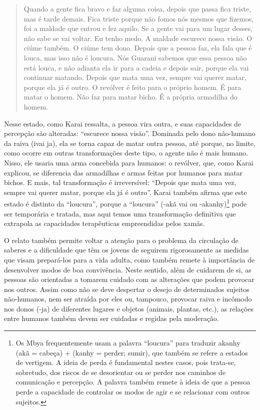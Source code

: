 \begin{quotation}
Quando a gente fica bravo e faz alguma coisa, depois que passa fica
triste, mas é tarde demais. Fica triste porque não fomos nós mesmos que
fizemos, foi a maldade que entrou e fez aquilo. Se a gente vai para um
lugar desses, não sabe se vai voltar. Eu tenho medo. A maldade escurece
nossa visão. O ciúme também. O ciúme tem dono. Depois que a pessoa faz,
ela fala que é louca, mas isso não é loucura. Nós Guarani sabemos que
essa pessoa não está louca, e não adianta ela ir para a cadeia e depois
sair, porque ela vai continuar matando. Depois que mata uma vez, sempre
vai querer matar, porque ela já é outro. O revólver é feito para o
próprio homem. É para matar o homem. Não faz para matar bicho. É a
própria armadilha do homem.

\end{quotation}
Nesse estado, como Karai ressalta, a pessoa vira outra, e suas
capacidades de percepção são alteradas: ``escurece nossa visão''.
Dominada pelo dono não-humano da raiva (ivai ja), ela se torna capaz de
matar outra pessoa, até porque, no limite, como ocorre em outras
transformações deste tipo, o agente não é mais humano. Nisso, ele
usaria uma arma concebida para humanos: o revólver, que, como Karai
explicou, se diferencia das armadilhas e armas feitas por humanos para
matar bichos. E mais, tal transformação é irreversível: ``Depois que
mata uma vez, sempre vai querer matar, porque ela já é outro''. Karai
também afirma que este estado é distinto da ``loucura'', porque a
``loucura'' (-akã vai ou {}-akanhy)\footnote{Os Mbya frequentemente usam
a palavra ``loucura'' para traduzir akanhy (akã = cabeça) + (kanhy =
perder; sumir), que também se refere a estados de vertigem. A ideia de
perda é fundamental nestes casos, pois trata-se, sobretudo, dos riscos
de se desorientar ou se perder nos caminhos de comunicação e percepção.
A palavra também remete à ideia de que a pessoa perde a capacidade de
controlar os modos de agir e se relacionar com outros sujeitos.} pode
ser temporária e tratada, mas aqui temos uma transformação definitiva
que extrapola as capacidades terapêuticas empreendidas pelos xamãs. 

O relato também permite voltar a atenção para o problema da circulação
de saberes e a dificuldade que têm os jovens de seguirem rigorosamente
as medidas que visam prepará-los para a vida adulta, como também remete
à importância de desenvolver modos de boa convivência. Neste sentido,
além de cuidarem de si, as pessoas são orientadas a tomarem cuidado com
as alterações que podem provocar nos outros. Assim como não se deve
despertar o desejo de determinados sujeitos não-humanos, nem ser
atraída por eles ou, tampouco, provocar raiva e incômodo nos donos
(-ja) de diferentes lugares e objetos (animais, plantas, etc.), as
relações entre humanos também devem ser cuidadas e regidas pela
moderação. 

